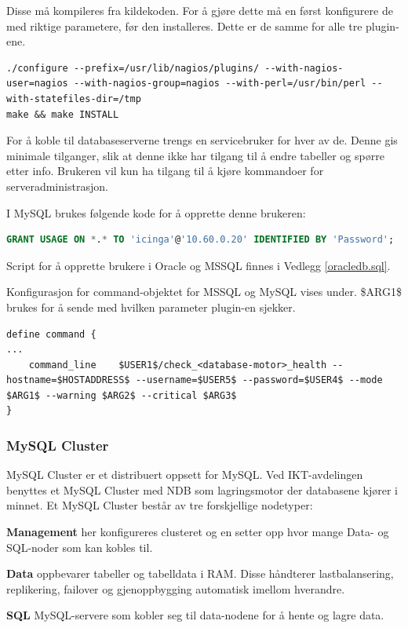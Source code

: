 Disse må kompileres fra kildekoden. For å gjøre dette må en først konfigurere de med riktige parametere, før den installeres. Dette er de samme for alle tre plugin-ene.

\begin{lstlisting}[style=example]
./configure --prefix=/usr/lib/nagios/plugins/ --with-nagios-user=nagios --with-nagios-group=nagios --with-perl=/usr/bin/perl --with-statefiles-dir=/tmp
make && make INSTALL
\end{lstlisting}

For å koble til databaseserverne trengs en servicebruker for hver av de. Denne gis minimale tilganger, slik at denne ikke har tilgang til å endre tabeller og spørre etter info. Brukeren vil kun ha tilgang til å kjøre kommandoer for serveradministrasjon\cite{mysqlpriv}.

I MySQL brukes følgende kode for å opprette denne brukeren:
\begin{lstlisting}[language=SQL,style=example]
GRANT USAGE ON *.* TO 'icinga'@'10.60.0.20' IDENTIFIED BY 'Password';
\end{lstlisting}

Script for å opprette brukere i Oracle og MSSQL finnes i Vedlegg \ref{oracledb.sql}.

Konfigurasjon for command-objektet for MSSQL og MySQL vises under. \$ARG1\$ brukes for å sende med hvilken parameter plugin-en sjekker.
\begin{lstlisting}[style=example]
define command {
...
    command_line	$USER1$/check_<database-motor>_health --hostname=$HOSTADDRESS$ --username=$USER5$ --password=$USER4$ --mode $ARG1$ --warning $ARG2$ --critical $ARG3$
}
\end{lstlisting}

\subsubsection{MySQL Cluster}
MySQL Cluster er et distribuert oppsett for MySQL. Ved IKT-avdelingen benyttes et MySQL Cluster med NDB som lagringsmotor der databasene kjører i minnet. Et MySQL Cluster består av tre forskjellige nodetyper\cite{ndbinformation}:
\begin{itemize*}
	\item \textbf{Management} her konfigureres clusteret og en setter opp hvor mange Data- og SQL-noder som kan kobles til.
	\item \textbf{Data} oppbevarer tabeller og tabelldata i RAM. Disse håndterer lastbalansering, replikering, failover og gjenoppbygging automatisk imellom hverandre.
	\item \textbf{SQL} MySQL-servere som kobler seg til data-nodene for å hente og lagre data.
\end{itemize*}

